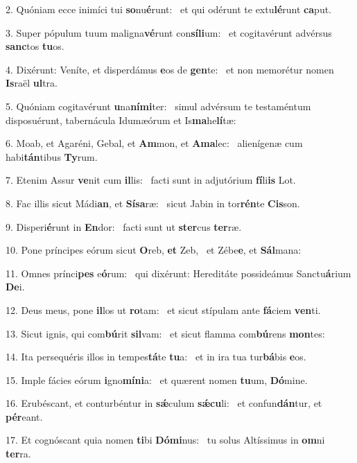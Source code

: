 2. Quóniam ecce inimíci tui \textbf{so}nu\textbf{é}runt: \ast\  et qui odérunt te extu\textbf{lé}runt \textbf{ca}put.\

3. Super pópulum tuum maligna\textbf{vé}runt con\textbf{sí}\textbf{li}um: \ast\  et cogitavérunt advérsus \textbf{sanc}tos \textbf{tu}os.\

4. Dixérunt: Veníte, et disperdámus \textbf{e}os de \textbf{gen}te: \ast\  et non memorétur nomen \textbf{Is}raël \textbf{ul}tra.\

5. Quóniam cogitavérunt \textbf{u}na\textbf{ní}\textbf{mi}ter: \ast\  simul advérsum te testaméntum disposuérunt, tabernácula Idumæórum et Is\textbf{ma}he\textbf{lí}tæ:\

6. Moab, et Agaréni, Gebal, et \textbf{Am}mon, et \textbf{A}\textbf{ma}lec: \ast\  alienígenæ cum habi\textbf{tán}tibus \textbf{Ty}rum.\

7. Etenim Assur \textbf{ve}nit cum \textbf{il}lis: \ast\  facti sunt in adjutórium \textbf{fí}li\textbf{is} Lot.\

8. Fac illis sicut Mádi\textbf{an}, et \textbf{Sí}\textbf{sa}ræ: \ast\  sicut Jabin in tor\textbf{rén}te \textbf{Cis}son.\

9. Disperi\textbf{é}runt in \textbf{En}dor: \ast\  facti sunt ut \textbf{ster}cus \textbf{ter}ræ.\

10. Pone príncipes eórum sicut \textbf{O}reb, \textbf{et} Zeb, \ast\  et Zébe\textbf{e}, et \textbf{Sál}mana:\

11. Omnes prínci\textbf{pes} e\textbf{ó}rum: \ast\  qui dixérunt: Hereditáte possideámus Sanctu\textbf{á}rium \textbf{De}i.\

12. Deus meus, pone \textbf{il}los ut \textbf{ro}tam: \ast\  et sicut stípulam ante \textbf{fá}ciem \textbf{ven}ti.\

13. Sicut ignis, qui com\textbf{bú}rit \textbf{sil}vam: \ast\  et sicut flamma com\textbf{bú}rens \textbf{mon}tes:\

14. Ita persequéris illos in tempes\textbf{tá}te \textbf{tu}a: \ast\  et in ira tua tur\textbf{bá}bis \textbf{e}os.\

15. Imple fácies eórum \textbf{i}gno\textbf{mí}\textbf{ni}a: \ast\  et quærent nomen \textbf{tu}um, \textbf{Dó}mine.\

16. Erubéscant, et conturbéntur in \textbf{sǽ}culum \textbf{sǽ}\textbf{cu}li: \ast\  et confun\textbf{dán}tur, et \textbf{pér}eant.\

17. Et cognóscant quia nomen \textbf{ti}bi \textbf{Dó}\textbf{mi}nus: \ast\  tu solus Altíssimus in \textbf{om}ni \textbf{ter}ra.\

